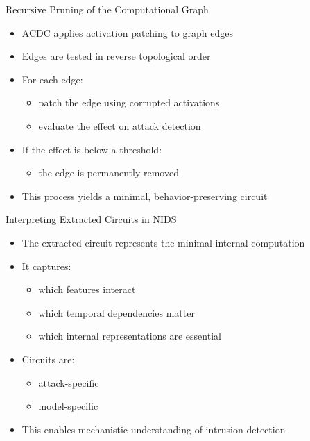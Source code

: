 \documentclass{beamer}
\begin{document}
	\begin{frame}{Recursive Pruning of the Computational Graph}
		\begin{itemize}
			\item ACDC applies activation patching to graph edges
			\item Edges are tested in reverse topological order
			\item For each edge:
			\begin{itemize}
				\item patch the edge using corrupted activations
				\item evaluate the effect on attack detection
			\end{itemize}
			\item If the effect is below a threshold:
			\begin{itemize}
				\item the edge is permanently removed
			\end{itemize}
			\item This process yields a minimal, behavior-preserving circuit
		\end{itemize}
	\end{frame}
	
	\begin{frame}{Interpreting Extracted Circuits in NIDS}
		\begin{itemize}
			\item The extracted circuit represents the minimal internal computation
			\item It captures:
			\begin{itemize}
				\item which features interact
				\item which temporal dependencies matter
				\item which internal representations are essential
			\end{itemize}
			\item Circuits are:
			\begin{itemize}
				\item attack-specific
				\item model-specific
			\end{itemize}
			\item This enables mechanistic understanding of intrusion detection
		\end{itemize}
	\end{frame}
	
\end{document}
